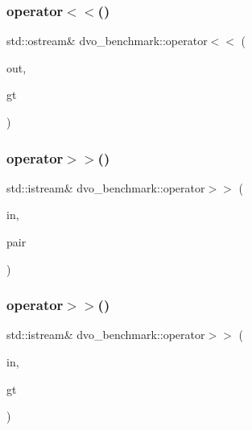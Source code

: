 \subsubsection{\texorpdfstring{operator$<$$<$()}{operator<<()}\hspace{0.1cm}{\footnotesize\ttfamily [2/2]}}
{\footnotesize\ttfamily std\+::ostream\& dvo\+\_\+benchmark\+::operator$<$$<$ (\begin{DoxyParamCaption}\item[{std\+::ostream \&}]{out,  }\item[{const \mbox{\hyperlink{classdvo__benchmark_1_1_groundtruth}{Groundtruth}} \&}]{gt }\end{DoxyParamCaption})}

\mbox{\label{namespacedvo__benchmark_aff4ff9a1b5ebd5946a3018867e76968b}} 
\subsubsection{\texorpdfstring{operator$>$$>$()}{operator>>()}\hspace{0.1cm}{\footnotesize\ttfamily [1/2]}}
{\footnotesize\ttfamily std\+::istream\& dvo\+\_\+benchmark\+::operator$>$$>$ (\begin{DoxyParamCaption}\item[{std\+::istream \&}]{in,  }\item[{\mbox{\hyperlink{classdvo__benchmark_1_1_rgbd_pair}{Rgbd\+Pair}} \&}]{pair }\end{DoxyParamCaption})}

\mbox{\label{namespacedvo__benchmark_aedfecf76a9e5dbf147f6301c8bd33749}} 
\subsubsection{\texorpdfstring{operator$>$$>$()}{operator>>()}\hspace{0.1cm}{\footnotesize\ttfamily [2/2]}}
{\footnotesize\ttfamily std\+::istream\& dvo\+\_\+benchmark\+::operator$>$$>$ (\begin{DoxyParamCaption}\item[{std\+::istream \&}]{in,  }\item[{\mbox{\hyperlink{classdvo__benchmark_1_1_groundtruth}{Groundtruth}} \&}]{gt }\end{DoxyParamCaption})}


